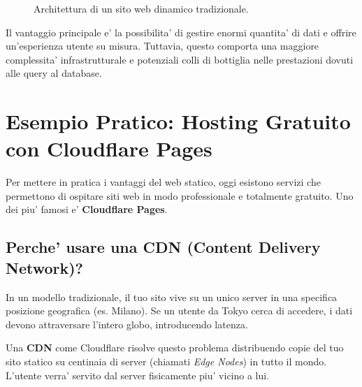 \documentclass[11pt,a4paper]{report}
\begin{document}
\begin{figure}[ht]
\centering
{}
\caption{Architettura di un sito web dinamico tradizionale.}
\label{fig:dynamic_web}
\end{figure}

Il vantaggio principale e' la possibilita' di gestire enormi quantita' di dati e offrire un'esperienza utente su misura. Tuttavia, questo comporta una maggiore complessita' infrastrutturale e potenziali colli di bottiglia nelle prestazioni dovuti alle query al database.

\section{Esempio Pratico: Hosting Gratuito con Cloudflare Pages}
Per mettere in pratica i vantaggi del web statico, oggi esistono servizi che permettono di ospitare siti web in modo professionale e totalmente gratuito. Uno dei piu' famosi e' \textbf{Cloudflare Pages}.

\subsection{Perche' usare una CDN (Content Delivery Network)?}
In un modello tradizionale, il tuo sito vive su un unico server in una specifica posizione geografica (es. Milano). Se un utente da Tokyo cerca di accedere, i dati devono attraversare l'intero globo, introducendo latenza.

Una \textbf{CDN} come Cloudflare risolve questo problema distribuendo copie del tuo sito statico su centinaia di server (chiamati \textit{Edge Nodes}) in tutto il mondo. L'utente verra' servito dal server fisicamente piu' vicino a lui.
\end{document}
